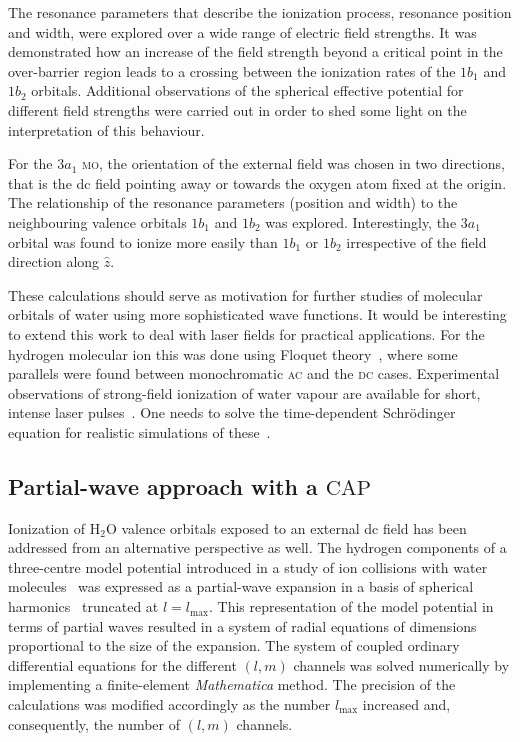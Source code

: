 The resonance parameters that describe the ionization process,
resonance position and width, were explored over a wide range of
electric field strengths. It was demonstrated how an increase of the
field strength beyond a critical point in the over-barrier region
leads to a crossing between the ionization rates of the $1b_{1}$ and
$1b_{2}$ orbitals. Additional observations of the spherical effective
potential for different field strengths were carried out in order to
shed some light on the interpretation of this behaviour.

For the $3a_{1}$ \textsc{mo}, the orientation of the external field
was chosen in two directions, that is the dc field pointing away or
towards the oxygen atom fixed at the origin. The relationship of the
resonance parameters (position and width) to the neighbouring valence
orbitals $1b_{1}$ and $1b_{2}$ was explored. Interestingly, the
$3a_{1}$ orbital was found to ionize more easily than $1b_{1}$ or
$1b_{2}$ irrespective of the field direction along $\hat{z}$.

These calculations should serve as motivation for further studies of
molecular orbitals of water using more sophisticated wave
functions. It would be interesting to extend this work to deal with
laser fields for practical applications. For the hydrogen molecular
ion this was done using Floquet theory~\cite{Tsog_H2mol_ac_2013},
where some parallels were found between monochromatic \textsc{ac} and
the \textsc{dc} cases. Experimental observations of strong-field
ionization of water vapour are available for short, intense laser
pulses~\cite{exp_h2o_laser_2008,exp_h2o_laser_2014}. One needs to
solve the time-dependent Schr\"{o}dinger equation for realistic
simulations of these~\cite{Farrell_2011,Falge_2010}.


\subsection*{Partial-wave approach with a $\mathrm{CAP}$}

Ionization of H$_{2}$O valence orbitals exposed to an external dc
field has been addressed from an alternative perspective as well. The
hydrogen components of a three-centre model potential introduced in a
study of ion collisions with water
molecules~\cite{illescas_modelV_2011} was expressed as a partial-wave
expansion in a basis of spherical harmonics~\cite{marko_partialwave}
truncated at $l = l_{\mathrm{max}}$. This representation of the model
potential in terms of partial waves resulted in a system of radial
equations of dimensions proportional to the size of the expansion. The
system of coupled ordinary differential equations for the different
$(l,m)$ channels was solved numerically by implementing a
finite-element \emph{Mathematica} method. The precision of the
calculations was modified accordingly as the number $l_{\mathrm{max}}$
increased and, consequently, the number of $(l,m)$ channels.

